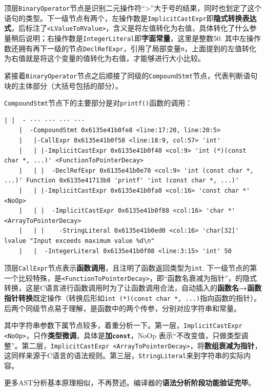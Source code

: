 \documentclass[UTF8,a4paper,10pt]{ctexart}
\begin{document}
\label{implicit-expr}顶层\texttt{BinaryOperator}节点是识别二元操作符“>”大于号的结果，同时也划定了这个语句的类型。下一级节点有两个，左操作数是\texttt{ImplicitCastExpr}即\textbf{隐式转换表达式}，后标注了\texttt{<LValueToRValue>}，含义是将左值转化为右值，具体转化了什么参量稍后说明；右操作数是\texttt{IntegerLiteral}即\textbf{字面常量}，这里是整数50. 其中左操作数还拥有再下一级的节点\texttt{DeclRefExpr}，引用了局部变量\texttt{n}，上面提到的左值转化为右值就是将这个变量的值转化为右值，才能够进行大小比较。

紧接着\texttt{BinaryOperator}节点之后顺接了同级的\texttt{CompoundStmt}节点，代表判断语句块的主体部分（大括号包括的部分）。

\texttt{CompoundStmt}节点下的主要部分是对\texttt{printf()}函数的调用：
\begin{lstlisting}[frame=trbl]
    | |  - ··· ··· ··· ···
    |  -CompoundStmt 0x6135e41b0fe8 <line:17:20, line:20:5>
    |   |-CallExpr 0x6135e41b0f58 <line:18:9, col:57> 'int'
    |   | |-ImplicitCastExpr 0x6135e41b0f40 <col:9> 'int (*)(const char *, ...)' <FunctionToPointerDecay>
    |   | |  -DeclRefExpr 0x6135e41b0e70 <col:9> 'int (const char *, ...)' Function 0x6135e41713b8 'printf' 'int (const char *, ...)'
    |   | |-ImplicitCastExpr 0x6135e41b0fa0 <col:16> 'const char *' <NoOp>
    |   | |  -ImplicitCastExpr 0x6135e41b0f88 <col:16> 'char *' <ArrayToPointerDecay>
    |   | |    -StringLiteral 0x6135e41b0ed0 <col:16> 'char[32]' lvalue "Input exceeds maximum value %d\n"
    |   |  -IntegerLiteral 0x6135e41b0f08 <line:3:15> 'int' 50
\end{lstlisting}

顶层\texttt{CallExpr}节点表示\textbf{函数调用}，且注明了函数返回类型为\texttt{int}. 下一级节点的第一个比较特殊，是\texttt{<FunctionToPointerDecay>}，即“函数名衰减为指针”，的隐式转换，这是C语言进行函数调用时为了让函数调用合法，自动插入的\textbf{函数名→函数指针转换}既定操作（转换后形如\texttt{int (*)(const char *, ...)}指向函数的指针）。后两个同级节点易于理解，是函数中的两个传参，分别对应字符串和常量。

其中字符串参数下属节点较多，着重分析一下。第一层，\texttt{ImplicitCastExpr <NoOp>}，只作\textbf{类型微调}，具体是\textbf{加\texttt{const}}，NoOp 表示“不改变值，只做类型调整”。第二层，\texttt{ImplicitCastExpr <ArrayToPointerDecay>}，将\textbf{数组衰减为指针}，这同样来源于C语言的语法规则。第三层，\texttt{StringLiteral}来到字符串的实际内容。

\vspace{1em}

更多AST分析基本原理相似，不再赘述。编译器的\textbf{语法分析阶段功能验证完毕}。
\end{document}
